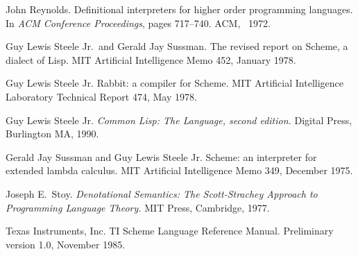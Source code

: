 \begin{thebibliography}{999}
John Reynolds.
Definitional interpreters for higher order programming languages.
In {\em ACM Conference Proceedings}, pages 717--740.
ACM, ~1972.

Guy Lewis Steele Jr.~and Gerald Jay Sussman.
The revised report on Scheme, a dialect of Lisp.
MIT Artificial Intelligence Memo 452, January 1978.

Guy Lewis Steele Jr.
Rabbit: a compiler for Scheme.
MIT Artificial Intelligence Laboratory Technical Report 474, May 1978.

Guy Lewis Steele Jr.
{\em Common Lisp: The Language, second edition.}
Digital Press, Burlington MA, 1990.

Gerald Jay Sussman and Guy Lewis Steele Jr.
Scheme: an interpreter for extended lambda calculus.
MIT Artificial Intelligence Memo 349, December 1975.

Joseph E.~Stoy.
{\em Denotational Semantics: The Scott-Strachey Approach to
  Programming Language Theory.}
MIT Press, Cambridge, 1977.

Texas Instruments, Inc.
TI Scheme Language Reference Manual.
Preliminary version 1.0, November 1985. 

\end{thebibliography}

